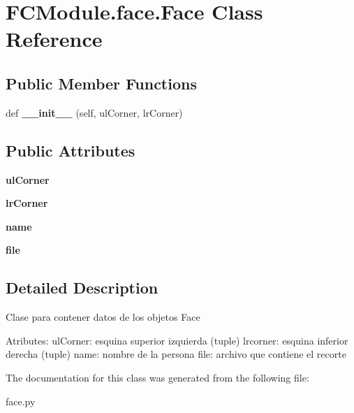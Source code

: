 \hypertarget{class_f_c_module_1_1face_1_1_face}{}\section{F\+C\+Module.\+face.\+Face Class Reference}
\label{class_f_c_module_1_1face_1_1_face}
\subsection*{Public Member Functions}
\begin{DoxyCompactItemize}
\item 
\mbox{\label{class_f_c_module_1_1face_1_1_face_a5ff0ae73e73bc15b7c92d45f339cd25f}} 
def {\bfseries \+\_\+\+\_\+init\+\_\+\+\_\+} (self, ul\+Corner, lr\+Corner)
\end{DoxyCompactItemize}
\subsection*{Public Attributes}
\begin{DoxyCompactItemize}
\item 
\mbox{\label{class_f_c_module_1_1face_1_1_face_a23e2d922b8ff5921a8c776d0a2f2f61a}} 
{\bfseries ul\+Corner}
\item 
\mbox{\label{class_f_c_module_1_1face_1_1_face_a43bf5b7efff377dfe7d6a3e25a58c0cc}} 
{\bfseries lr\+Corner}
\item 
\mbox{\label{class_f_c_module_1_1face_1_1_face_ac6d9689048431c7a6ee57dd4427bf1fd}} 
{\bfseries name}
\item 
\mbox{\label{class_f_c_module_1_1face_1_1_face_a40c9a64c12394c21bb6378bc13a92602}} 
{\bfseries file}
\end{DoxyCompactItemize}


\subsection{Detailed Description}
\begin{DoxyVerb}Clase para contener datos de los objetos Face

Atributes:
    ulCorner: esquina superior izquierda (tuple)
    lrcorner: esquina inferior derecha (tuple)
    name: nombre de la persona
    file: archivo que contiene el recorte
\end{DoxyVerb}
 

The documentation for this class was generated from the following file\+:\begin{DoxyCompactItemize}
\item 
face.\+py\end{DoxyCompactItemize}
